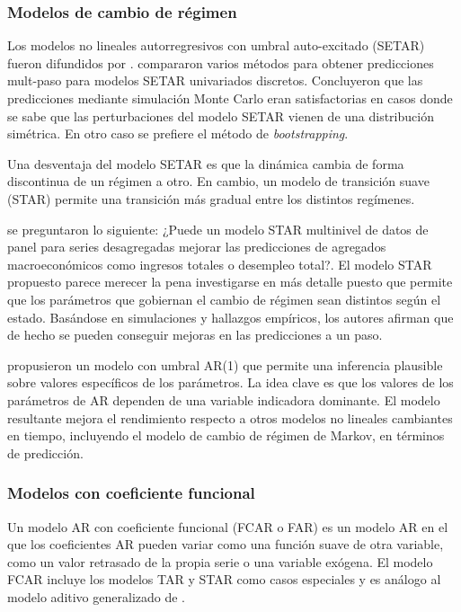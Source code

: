\documentclass{llncs}
\begin{document}
\subsubsection{Modelos de cambio de régimen}
Los modelos no lineales autorregresivos con umbral auto-excitado (SETAR) fueron difundidos por \cite{Tong1990}.  \cite{Clements1997463} compararon varios métodos para obtener predicciones mult-paso para modelos SETAR univariados discretos. Concluyeron que las predicciones mediante simulación Monte Carlo eran satisfactorias en casos donde se sabe que las perturbaciones del modelo SETAR vienen de una distribución simétrica. En otro caso se prefiere el método de \emph{bootstrapping}. 

Una desventaja del modelo SETAR es que la dinámica cambia de forma discontinua de un régimen a otro. En cambio, un modelo de transición suave (STAR) permite una transición más gradual entre los distintos regímenes. 

\cite{Fok2005785} se preguntaron lo siguiente: ¿Puede un modelo STAR multinivel de datos de panel para series desagregadas mejorar las predicciones de agregados macroeconómicos como ingresos totales o desempleo total?. El modelo STAR propuesto parece merecer la pena investigarse en más detalle puesto que permite que los parámetros que gobiernan el cambio de régimen sean distintos según el estado. Basándose en simulaciones y hallazgos empíricos, los autores afirman que de hecho se pueden conseguir mejoras en las predicciones a un paso.

\cite{Franses2004255} propusieron un modelo con umbral AR(1) que permite una inferencia plausible sobre valores específicos de los parámetros. La idea clave es que los valores de los parámetros de AR dependen de una variable indicadora dominante. El modelo resultante mejora el rendimiento respecto a otros modelos no lineales cambiantes en tiempo, incluyendo el modelo de cambio de régimen de Markov, en términos de predicción.

\subsubsection{Modelos con coeficiente funcional}
Un modelo AR con coeficiente funcional (FCAR o FAR) es un modelo AR en el que los coeficientes AR pueden variar como una función suave de otra variable, como un valor retrasado de la propia serie o una variable exógena. El modelo FCAR incluye los modelos TAR y STAR como casos especiales y es análogo al modelo aditivo generalizado de \cite{Hastie1990}. 
\end{document}
